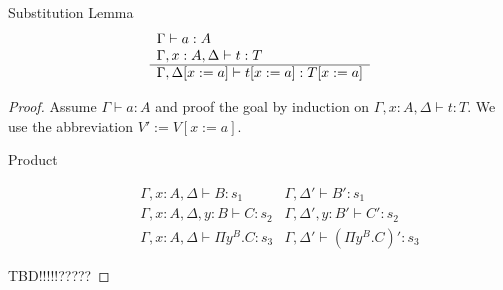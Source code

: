\documentclass[12pt]{article}
\begin{document}
\begin{theorem} Substitution Lemma
  $$
  \begin{array}{l} \Gamma\vdash a:A
    \\
    \Gamma,x:A,\Delta\vdash t:T
   \\ \hline \Gamma,\Delta[x:=a] \vdash t[x:=a] : T[x:=a]\end{array}
  $$
  \begin{proof} Assume $\Gamma\vdash a:A$ and proof the goal by induction on
    $\Gamma,x:A,\Delta\vdash t:T$. We use the abbreviation $V' := V[x:=a]$.
    \begin{description}
    \item[Product]
      $$
      \begin{array}{l|l}
        \Gamma,x:A,\Delta\vdash B:s_1
        & \Gamma,\Delta' \vdash B': s_1
        \\
        \Gamma,x:A,\Delta,y:B \vdash C:s_2
        & \Gamma,\Delta',y:B' \vdash C': s_2
        \\
        \hline
        \Gamma,x:A,\Delta \vdash \Pi y^B.C: s_3
        & \Gamma,\Delta' \vdash (\Pi y^B.C)': s_3
      \end{array}
      $$
    \end{description}
    TBD!!!!!?????
  \end{proof}
\end{theorem}
\end{document}
